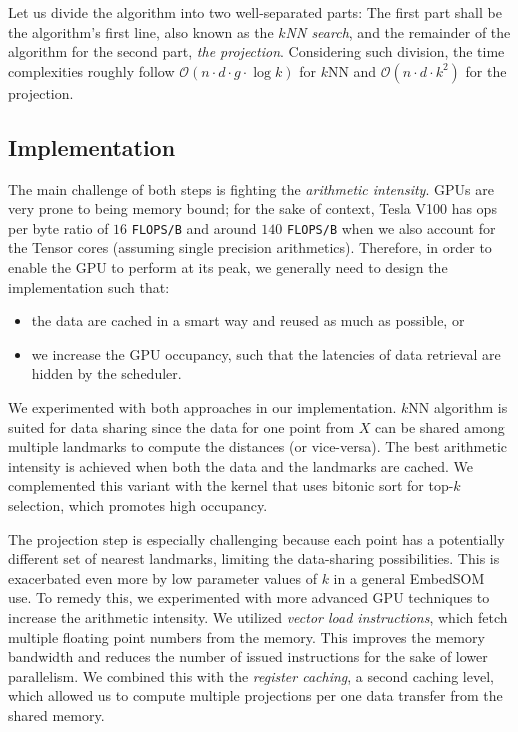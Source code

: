 Let us divide the algorithm into two well-separated parts: The first part shall be the algorithm's first line, also known as the \emph{$k$NN search}, and the remainder of the algorithm for the second part, \emph{the projection}. Considering such division, the time complexities roughly follow $\mathcal{O}(n\cdot d \cdot g \cdot \log k)$ for $k$NN and $\mathcal{O}(n\cdot d \cdot k^2)$ for the projection.

\subsection{Implementation}

The main challenge of both steps is fighting the \emph{arithmetic intensity}. GPUs are very prone to being memory bound; for the sake of context, Tesla V100 has ops per byte ratio of $16$ \texttt{FLOPS/B} and around $140$ \texttt{FLOPS/B} when we also account for the Tensor cores (assuming single precision arithmetics). Therefore, in order to enable the GPU to perform at its peak, we generally need to design the implementation such that:
\begin{itemize}
    \item the data are cached in a smart way and reused as much as possible, or
    \item we increase the GPU occupancy, such that the latencies of data retrieval are hidden by the scheduler.
\end{itemize}

We experimented with both approaches in our implementation. $k$NN algorithm is suited for data sharing since the data for one point from $X$ can be shared among multiple landmarks to compute the distances (or vice-versa). The best arithmetic intensity is achieved when both the data and the landmarks are cached. We complemented this variant with the kernel that uses bitonic sort for top-$k$ selection, which promotes high occupancy.

The projection step is especially challenging because each point has a potentially different set of nearest landmarks, limiting the data-sharing possibilities. This is exacerbated even more by low parameter values of $k$ in a general EmbedSOM use. To remedy this, we experimented with more advanced GPU techniques to increase the arithmetic intensity. We utilized \emph{vector load instructions}, which fetch multiple floating point numbers from the memory. This improves the memory bandwidth and reduces the number of issued instructions for the sake of lower parallelism. We combined this with the \emph{register caching}, a second caching level, which allowed us to compute multiple projections per one data transfer from the shared memory. 

